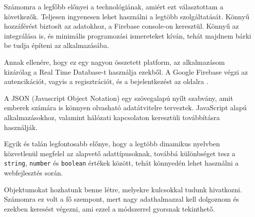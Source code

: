 Számomra a legfőbb előnyei a technológiának, amiért ezt választottam a következők. Teljesen ingyenesen lehet használni a legtöbb szolgáltatását. Könnyű hozzáférést biztosít az adatokhoz, a Firebase console-on keresztül. Könnyű az integrálása is, és minimális programozási ismereteket kíván, tehát majdnem bárki be tudja építeni az alkalmazásába.

Annak ellenére, hogy ez egy nagyon összetett platform, az alkalmazásom kizárólag a Real Time Database-t használja ezekből. A Google Firebase végzi az autencikációt, vagyis a regisztrációt, és a bejelentkezést az oldalra
\cite{firebase}.


A JSON (Javascript Object Notation) egy szövegalapú nyílt szabvány, amit emberek számára is könnyen olvasható adatátvitelre terveztek. JavaScript alapú alkalmazásokhoz, valamint hálózati kapcsolaton keresztüli továbbításra használják. 

Egyik és talán legfontosabb előnye, hogy a legtöbb dinamikus nyelvben közvetlenül megfelel az alapvető adattípusoknak, továbbá különbséget tesz a \texttt{string}, \texttt{number} és \texttt{boolean} értékek között, tehát könnyedén lehet használni a webfejlesztés során.

Objektumokat hozhatunk benne létre, melyekre kulcsokkal tudunk hivatkozni. Számomra ez volt a fő szempont, mert nagy adathalmazzal kell dolgoznom és ezekben keresést végezni, ami ezzel a módszerrel gyorsnak tekinthető.
